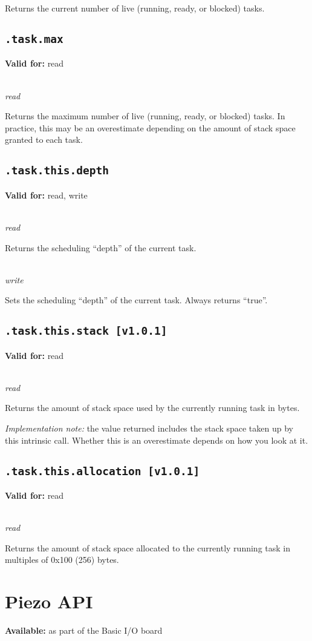 \documentclass{article}
\begin{document}
Returns the current number of live (running, ready, or blocked) tasks.

\subsection{\texttt{.task.max}}
\textbf{Valid for:} read

~\\
\textit{read}

Returns the maximum number of live (running, ready, or blocked) tasks. In practice, this may be an overestimate depending on the amount of stack space granted to each task.

\subsection{\texttt{.task.this.depth}}
\textbf{Valid for:} read, write

~\\
\textit{read}

Returns the scheduling ``depth'' of the current task.

~\\
\textit{write}

Sets the scheduling ``depth'' of the current task. Always returns ``true''.

\subsection{\texttt{.task.this.stack [v1.0.1]}}
\textbf{Valid for:} read

~\\
\textit{read}

Returns the amount of stack space used by the currently running task in bytes.

\textit{Implementation note:} the value returned includes the stack space taken up by this intrinsic call.
Whether this is an overestimate depends on how you look at it.

\subsection{\texttt{.task.this.allocation [v1.0.1]}}
\textbf{Valid for:} read

~\\
\textit{read}

Returns the amount of stack space allocated to the currently running task in multiples of 0x100 (256) bytes.

\section{Piezo API}
\textbf{Available:} as part of the Basic I/O board
\end{document}
